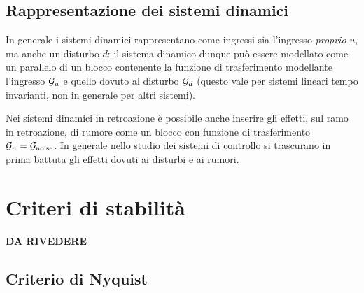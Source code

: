 	\subsection{Rappresentazione dei sistemi dinamici}
		In generale i sistemi dinamici rappresentano come ingressi sia l'ingresso \textit{proprio} $u$, ma anche un disturbo $d$: il sistema dinamico dunque può essere modellato come un parallelo di un blocco contenente la funzione di trasferimento modellante l'ingresso $\mathcal G_u$ e quello dovuto al disturbo $\mathcal G_d$ (questo vale per sistemi lineari tempo invarianti, non in generale per altri sistemi).
		
		Nei sistemi dinamici in retroazione è possibile anche inserire gli effetti, sul ramo in retroazione, di rumore come un blocco con funzione di trasferimento $\mathcal G_n = \mathcal G_\textrm{noise}$. In generale nello studio dei sistemi di controllo si trascurano in prima battuta gli effetti dovuti ai disturbi e ai rumori.
		
		
\section{Criteri di stabilità}
	
	\textbf{DA RIVEDERE}
	
	\subsection{Criterio di Nyquist}
	
